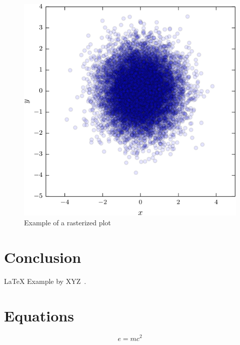 \begin{multicols}{2}
\begin{figure}[H]
	\centering
	\includegraphics[width=0.9\columnwidth]{figures/figure_rasterized.pdf}
	\caption{Example of a rasterized plot}
\end{figure}

\lipsum[6] %

\section{Conclusion}\label{sec:conclusion}

\lipsum[7] %
\LaTeX{} Example by XYZ~\cite{doe2006test}.

\section{Equations}\label{sec:eq}
\begin{equation}
	\label{eq:emc}
	e = mc^2
\end{equation}








\end{multicols}

